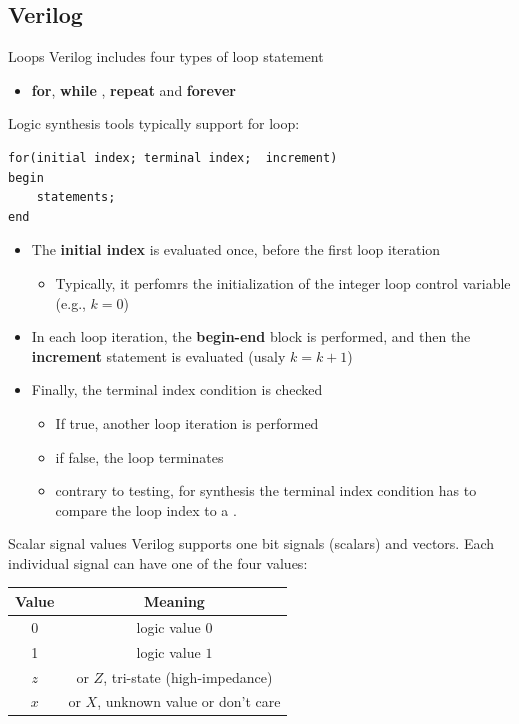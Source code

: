 \subsection{Verilog}
\begin{parag}{Loops}
    Verilog  includes four types of loop statement
    \begin{itemize}
        \item \textbf{for}, \textbf{while} , \textbf{repeat} and \textbf{forever}
    \end{itemize}
    Logic synthesis tools typically support for loop:
    \begin{lstlisting}
for(initial index; terminal index;  increment)
begin
    statements;
end  
    \end{lstlisting}
    
    \begin{itemize}
        \item The \textbf{initial index} is evaluated once, before the first loop iteration
            \begin{itemize}
                \item Typically, it perfomrs the initialization of the integer loop control variable (e.g., $k = 0$)
            \end{itemize}
            \item In each loop iteration, the \textbf{begin-end} block is performed, and then the \textbf{increment} statement is evaluated (usaly $k = k+1$)
    \item Finally, the terminal index condition is checked
\begin{itemize}
    \item If true, another loop iteration is performed
    \item  if false, the loop terminates
    \item contrary to testing, for synthesis the terminal index condition has to compare the loop index to a .
\end{itemize}

    \end{itemize}
    
\end{parag}
\begin{parag}{Scalar signal values}
    Verilog supports one bit signals (scalars) and vectors. Each individual signal can have one of the four values:
    \begin{center} \begin{tabular}{cc} \hline Value & Meaning \\ \hline $0$ & logic value $0$ \\ 1 & logic value $1$ \\ $z$ & or $Z$, tri-state (high-impedance) \\ $x$ &  or $X$, unknown value or don't care \end{tabular} \end{center} 
    
\end{parag}
